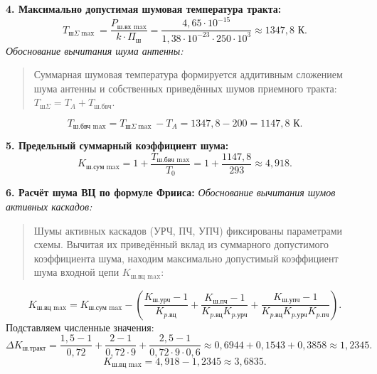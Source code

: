 \documentclass[12pt,a4paper]{article}
\begin{document}
\textbf{4. Максимально допустимая шумовая температура тракта:}
\begin{equation}
T_{\text{ш}\Sigma \max} = \frac{P_{\text{ш.вх max}}}{k \cdot \Pi_{\text{ш}}} = \frac{4{,}65 \cdot 10^{-15}}{1{,}38 \cdot 10^{-23} \cdot 250 \cdot 10^3} \approx 1347{,}8\text{ К}.
\end{equation}
\textit{Обоснование вычитания шума антенны:}
\begin{quote}
Суммарная шумовая температура формируется аддитивным сложением шума антенны и собственных приведённых шумов приемного тракта: $T_{\text{ш}\Sigma} = T_A + T_{\text{ш.бвч}}$.
\end{quote}
\begin{equation}
T_{\text{ш.бвч max}} = T_{\text{ш}\Sigma \max} - T_A = 1347{,}8 - 200 = 1147{,}8\text{ К}.
\end{equation}

\textbf{5. Предельный суммарный коэффициент шума:}
\begin{equation}
K_{\text{ш.сум max}} = 1 + \frac{T_{\text{ш.бвч max}}}{T_0} = 1 + \frac{1147{,}8}{293} \approx 4{,}918.
\end{equation}

\textbf{6. Расчёт шума ВЦ по формуле Фрииса:}
\textit{Обоснование вычитания шумов активных каскадов:}
\begin{quote}
Шумы активных каскадов (УРЧ, ПЧ, УПЧ) фиксированы параметрами схемы. Вычитая их приведённый вклад из суммарного допустимого коэффициента шума, находим максимально допустимый коэффициент шума входной цепи $K_{\text{ш.вц max}}$:
\end{quote}
\begin{equation}
K_{\text{ш.вц max}} = K_{\text{ш.сум max}} - \left( \frac{K_{\text{ш.урч}} - 1}{K_{p.\text{вц}}} + \frac{K_{\text{ш.пч}} - 1}{K_{p.\text{вц}} K_{p.\text{урч}}} + \frac{K_{\text{ш.упч}} - 1}{K_{p.\text{вц}} K_{p.\text{урч}} K_{p.\text{пч}}} \right).
\end{equation}
Подставляем численные значения:
\begin{equation}
\Delta K_{\text{ш.тракт}} = \frac{1{,}5 - 1}{0{,}72} + \frac{2 - 1}{0{,}72 \cdot 9} + \frac{2{,}5 - 1}{0{,}72 \cdot 9 \cdot 0{,}6} \approx 0{,}6944 + 0{,}1543 + 0{,}3858 \approx 1{,}2345.
\end{equation}
\begin{equation}
K_{\text{ш.вц max}} = 4{,}918 - 1{,}2345 \approx 3{,}6835.
\end{equation}
\end{document}
